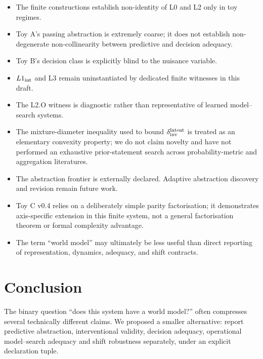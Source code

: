 \documentclass[10pt]{article}
\begin{document}
\begin{itemize}
    \item The finite constructions establish non-identity of L0 and L2 only in toy regimes.
    \item Toy A's passing abstraction is extremely coarse; it does not establish non-degenerate non-collinearity between predictive and decision adequacy.
    \item Toy B's decision class is explicitly blind to the nuisance variable.
    \item $L1_{\rm int}$ and L3 remain uninstantiated by dedicated finite witnesses in this draft.
    \item The L2.O witness is diagnostic rather than representative of learned model--search systems.
    \item The mixture-diameter inequality used to bound $\delta_{\rm inv}^{\rm latent}$ is treated as an elementary convexity property; we do not claim novelty and have not performed an exhaustive prior-statement search across probability-metric and aggregation literatures.
    \item The abstraction frontier is externally declared. Adaptive abstraction discovery and revision remain future work.
    \item Toy C v0.4 relies on a deliberately simple parity factorisation; it demonstrates axis-specific extension in this finite system, not a general factorisation theorem or formal complexity advantage.
    \item The term ``world model'' may ultimately be less useful than direct reporting of representation, dynamics, adequacy, and shift contracts.
\end{itemize}

\section{Conclusion}

The binary question ``does this system have a world model?'' often compresses several technically different claims. We proposed a smaller alternative: report predictive abstraction, interventional validity, decision adequacy, operational model--search adequacy and shift robustness separately, under an explicit declaration tuple.
\end{document}
